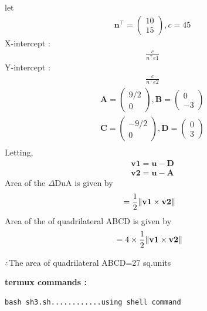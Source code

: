 \documentclass[10pt, a4paper]{article}
\newcommand{\myvec}[1]{\ensuremath{\begin{pmatrix}#1\end{pmatrix}}}
\let\vec\mathbf
\begin{document}
let
		\begin{align}
	    \vec{n}^{\top} = \myvec{10 \\ 15},c=45
	    	\end{align}
	    X-intercept :
	    \begin{align}
	    \frac{c}{n^{\top}e1}
	    \end{align}
	    Y-intercept : 
	    \begin{align}
	    \frac{c}{n^{\top}e2}
	    \end{align}
	    \begin{align}
	    \vec{A} = \myvec{9/2 \\ 0},  
	    \vec{B} = \myvec{ 0 \\ -3}\\
	    \vec{C} = \myvec{-9/2 \\ 0},    
	    \vec{D} = \myvec{ 0 \\ 3}\\
		\end{align}
Letting,
\begin{align}
\vec{v1}=\vec{u}-\vec{D}\\
\vec{v2}=\vec{u}-\vec{A}
\end{align}		
	Area of the $\Delta$DuA is given by 
	\begin{align}
&=\frac{1}{2}\norm{\vec{v1}\times\vec{v2}}
\end{align}
	Area of the of quadrilateral ABCD is given by 
	\begin{align}
&=4\times\frac{1}{2}\norm{\vec{v1}\times\vec{v2}}
\end{align}
\begin{center}
    $\therefore$The area of quadrilateral ABCD=27 sq.units\\
\end{center}
\textbf{termux commands :}
\begin{lstlisting}
bash sh3.sh............using shell command
\end{lstlisting}
\end{document}
